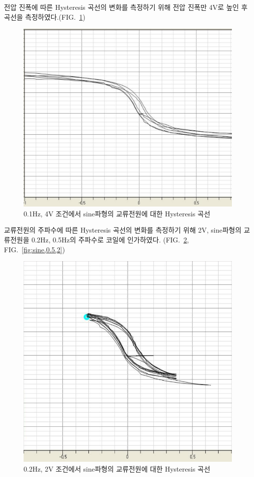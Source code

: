 \documentclass[aps,reprint,superscriptaddress,10pt]{revtex4-2}
\begin{document}
전압 진폭에 따른 Hysteresis 곡선의 변화를 측정하기 위해 전압 진폭만 4V로 높인 후
곡선을 측정하였다.(FIG.~\ref{fig:sine,0.1,4})
\begin{figure}[htbp]
  \centering
  \includegraphics[scale = 0.15]{sine,0.1,4.png}
  \caption{0.1Hz, 4V 조건에서 sine파형의 교류전원에 대한 Hysteresis 곡선}
  \label{fig:sine,0.1,4}
\end{figure}
\newpage

교류전원의 주파수에 따른 Hysteresis 곡선의 변화를 측정하기 위해 2V, sine파형의
교류전원을 0.2Hz, 0.5Hz의 주파수로 코일에 인가하였다. 
(FIG.~\ref{fig:sine,0.2,2}, FIG.~\ref{fig:sine,0.5,2})
\begin{figure}[htbp]
  \centering
  \includegraphics[scale = 0.175]{sine,0.2,2.png}
  \caption{0.2Hz, 2V 조건에서 sine파형의 교류전원에 대한 Hysteresis 곡선}
  \label{fig:sine,0.2,2}
\end{figure}
\end{document}
